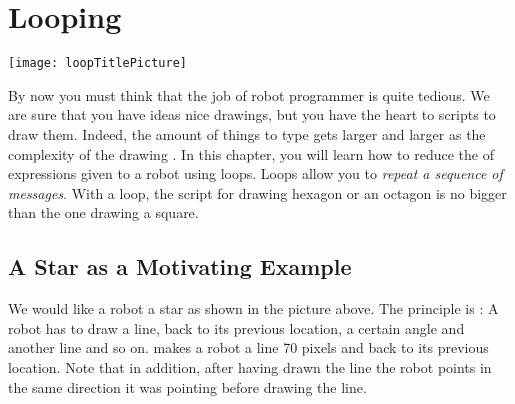 \ifx\wholebook\relax\else



\fi

\chapter{Looping}\label{ch:looping}\label{cha:loops}

\begin{chapterfigure}
\texttt{[image: loopTitlePicture]}
\end{chapterfigure}



By now you must think that the job of robot programmer is quite
tedious. We are sure that you have ideas  nice drawings, but you  have the heart to  scripts to draw them.  Indeed, the
  amount of things to type gets larger and larger as the complexity of the drawing . \add{\paragraph
}
In this chapter, you will learn how to reduce the  of expressions given to a robot  using loops. Loops allow you to \emph{repeat a sequence of messages}. With a loop, the script for drawing  hexagon or an octagon is no bigger than the one  drawing a square.

\section{A Star as a Motivating Example}
We would like  a robot  a star as shown in the picture above. The principle is : A robot has to draw a line,  back to its previous location,  a certain angle and  another line \add{--} and so on. \add{\paragraph
}
  makes a robot  a line  70 pixels 
and  back to its previous location. Note that in addition, after having drawn the line the robot points in the same direction  it was pointing before drawing the line.

